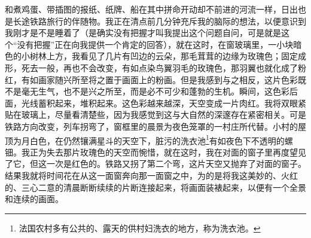 \par 和煮鸡蛋、带插图的报纸、纸牌、船在其中拼命开动却不前进的河流一样，日出也是长途铁路旅行的伴随物。我正在清点前几分钟充斥我的脑际的想法，以便意识到我刚才是不是睡着了（是确实没有把握才叫我提出这个问题自问，可是就是这个“没有把握”正在向我提供一个肯定的回答），就在这时，在窗玻璃里，一小块暗色的小树林上方，我看见了几片有凹边的云朵，那毛茸茸的边缘为玫瑰色；固定成形，死去一般，再也不会改变，有如点染鸟翼羽毛的玫瑰色，那羽翼也就化成了粉红，有如画家随兴所至将之置于画面上的粉画。但是我感到与之相反，这片色彩既不是毫无生气，也不是兴之所至，而是必不可少和蓬勃的生机。瞬间，这色彩后面，光线蓄积起来，堆积起来。这色彩越来越深，天空变成一片肉红。我将双眼紧贴在玻璃上，尽量看清楚些，因为我感觉到这与大自然的深邃存在紧密相关。可是铁路方向改变，列车拐弯了，窗框里的晨景为夜色笼罩的一村庄所代替。小村的屋顶为月白色，在仍然镶满星斗的天空下，脏污的洗衣池\footnote{法国农村多有公共的、露天的供村妇洗衣的地方，称为洗衣池。}有如夜色下不透明的螺钿。我正为失去那片玫瑰色的天空而惋惜，就在这时，我在对面的窗子里再度望见了它，但这一次是红色的。铁路又拐了第二个弯，这片天空又抛弃了对面的窗子。结果我就将时间花在从这一面窗奔向那一面窗之中，为的是将我这美妙的、火红的、三心二意的清晨断断续续的片断连接起来，将画面装裱起来，以便有一个全景和连续的画面。
